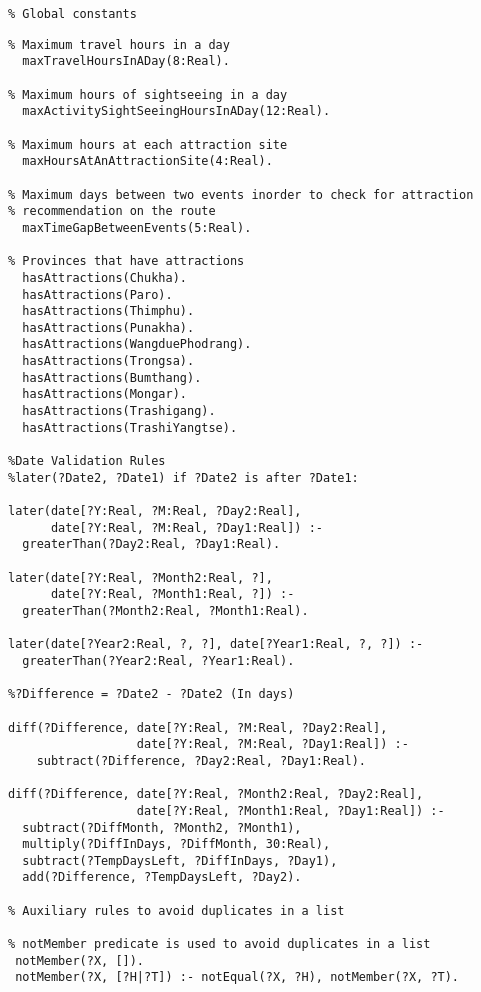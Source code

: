 \singlespacing
\begin{verbatim}
% Global constants
\end{verbatim}
\vspace{-0.25in}
\footnotesize
\begin{verbatim}
% Maximum travel hours in a day
  maxTravelHoursInADay(8:Real).
   
% Maximum hours of sightseeing in a day
  maxActivitySightSeeingHoursInADay(12:Real).

% Maximum hours at each attraction site
  maxHoursAtAnAttractionSite(4:Real).
 
% Maximum days between two events inorder to check for attraction 
% recommendation on the route
  maxTimeGapBetweenEvents(5:Real).

% Provinces that have attractions  
  hasAttractions(Chukha). 
  hasAttractions(Paro). 
  hasAttractions(Thimphu). 
  hasAttractions(Punakha). 
  hasAttractions(WangduePhodrang). 
  hasAttractions(Trongsa). 
  hasAttractions(Bumthang). 
  hasAttractions(Mongar). 
  hasAttractions(Trashigang). 
  hasAttractions(TrashiYangtse).  

%Date Validation Rules
%later(?Date2, ?Date1) if ?Date2 is after ?Date1:

later(date[?Y:Real, ?M:Real, ?Day2:Real], 
      date[?Y:Real, ?M:Real, ?Day1:Real]) :-
  greaterThan(?Day2:Real, ?Day1:Real).
	
later(date[?Y:Real, ?Month2:Real, ?], 
      date[?Y:Real, ?Month1:Real, ?]) :-
  greaterThan(?Month2:Real, ?Month1:Real).	
	
later(date[?Year2:Real, ?, ?], date[?Year1:Real, ?, ?]) :-
  greaterThan(?Year2:Real, ?Year1:Real).

%?Difference = ?Date2 - ?Date2 (In days)

diff(?Difference, date[?Y:Real, ?M:Real, ?Day2:Real], 
                  date[?Y:Real, ?M:Real, ?Day1:Real]) :-
	subtract(?Difference, ?Day2:Real, ?Day1:Real).

diff(?Difference, date[?Y:Real, ?Month2:Real, ?Day2:Real], 
                  date[?Y:Real, ?Month1:Real, ?Day1:Real]) :-
  subtract(?DiffMonth, ?Month2, ?Month1),
  multiply(?DiffInDays, ?DiffMonth, 30:Real),
  subtract(?TempDaysLeft, ?DiffInDays, ?Day1),
  add(?Difference, ?TempDaysLeft, ?Day2).

% Auxiliary rules to avoid duplicates in a list

% notMember predicate is used to avoid duplicates in a list
 notMember(?X, []).
 notMember(?X, [?H|?T]) :- notEqual(?X, ?H), notMember(?X, ?T).


\end{verbatim}
